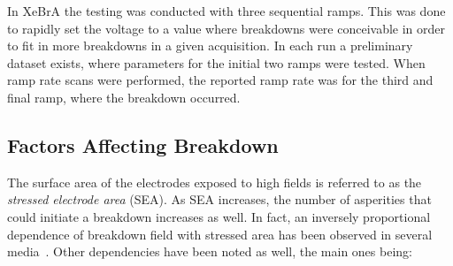 In XeBrA the testing was conducted with three sequential ramps.
This was done to rapidly set the voltage to a value where breakdowns were conceivable in order to fit in more breakdowns in a given acquisition.
In each run a preliminary dataset exists, where parameters for the initial two ramps were tested.
When ramp rate scans were performed, the reported ramp rate was for the third and final ramp, where the breakdown occurred.

\subsection{Factors Affecting Breakdown}
The surface area of the electrodes exposed to high fields is referred to as the \textit{stressed electrode area} (SEA).
As SEA increases, the number of asperities that could initiate a breakdown increases as well.
In fact, an inversely proportional dependence of breakdown field with stressed area has been observed in several media~\cite{auger_electric_2016,hayakawa_breakdown_1997,blatter_experimental_2014,weber_area_1956,goshima_statistical_1994,gerhold_dc-breakdown_1999}.
Other dependencies have been noted as well, the main ones being:

